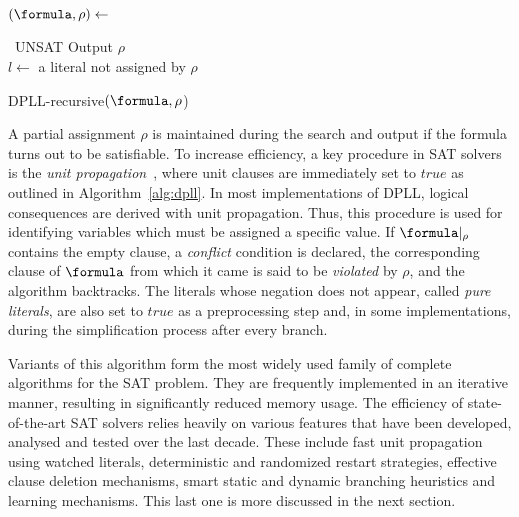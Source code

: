 \begin{algorithm}[htp]
    \SetAlgoLined\DontPrintSemicolon
    $(\formula, \rho) \leftarrow$ \proc{$\formula,\rho$}

    {\Return~UNSAT}
    {Output $\rho$\\
    }
    $l \leftarrow$ a literal not assigned by $\rho$

    {}

    \vspace{2mm}
    \setcounter{AlgoLine}{0}
    \caption{DPLL-recursive$(\formula, \rho$)}
    \label{alg:dpll}
\end{algorithm} 

A partial assignment $\rho$ is maintained during the search and output if the
formula turns out to be satisfiable.  To increase efficiency, a key procedure in SAT
solvers is the \emph{unit propagation}~\cite{cdclchapter}, where unit clauses
are immediately set to $true$ as outlined in Algorithm~\ref{alg:dpll}. In most
implementations of DPLL, logical consequences are derived with unit propagation.
Thus, this procedure is used for identifying variables which must be assigned
a specific value. If $\formula |_\rho$ contains the empty clause, a
\emph{conflict} condition is declared, the corresponding clause of $\formula$
from which it came is said to be \emph{violated} by $\rho$, and the algorithm
backtracks. The literals whose negation does not appear, called \emph{pure
literals}, are also set to $true$ as a preprocessing step and, in some
implementations, during the simplification process after every branch. 

Variants of this algorithm form the most widely used family of complete
algorithms for the SAT problem. They are frequently implemented in an iterative
manner, resulting in significantly reduced memory usage. The efficiency of
state-of-the-art SAT solvers relies heavily on various features that have been
developed, analysed and tested over the last decade. These include fast unit
propagation using watched literals, deterministic and randomized restart
strategies, effective clause deletion mechanisms, smart static and dynamic
branching heuristics and learning mechanisms. This last one is more discussed in
the next section.

